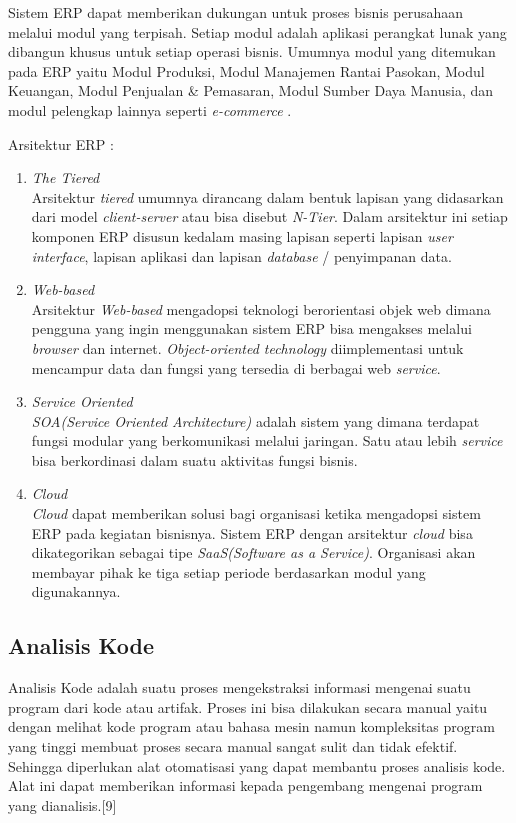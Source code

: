 Sistem ERP dapat memberikan dukungan untuk proses bisnis perusahaan melalui modul yang terpisah. Setiap modul adalah aplikasi perangkat lunak yang dibangun khusus untuk setiap operasi bisnis. Umumnya modul yang ditemukan pada ERP yaitu Modul Produksi, Modul Manajemen Rantai Pasokan, Modul Keuangan, Modul Penjualan \& Pemasaran, Modul Sumber Daya Manusia, dan modul pelengkap lainnya seperti \textit{e-commerce} \cite{1}.

Arsitektur ERP \cite{1}: 
\begin{enumerate}[leftmargin=1.3cm]
	\item \textit{The Tiered}\\
	Arsitektur \textit{tiered} umumnya dirancang dalam bentuk lapisan yang didasarkan dari model \textit{client-server} atau bisa disebut \textit{N-Tier}. Dalam arsitektur ini setiap komponen ERP disusun kedalam masing lapisan seperti lapisan \textit{user interface}, lapisan aplikasi dan lapisan \textit{database} / penyimpanan data.
	\item \textit{Web-based}\\
	Arsitektur \textit{Web-based} mengadopsi teknologi berorientasi objek web dimana pengguna yang ingin menggunakan sistem ERP bisa mengakses melalui \textit{browser} dan internet. \textit{Object-oriented technology} diimplementasi untuk mencampur data dan fungsi yang tersedia di berbagai web \textit{service}.
	\item \textit{Service Oriented}\\
	\textit{SOA(Service Oriented Architecture)} adalah sistem yang dimana terdapat fungsi  modular yang berkomunikasi melalui jaringan. Satu atau lebih \textit{service} bisa berkordinasi dalam suatu aktivitas fungsi bisnis. 
	\item \textit{Cloud}\\
	\textit{Cloud} dapat memberikan solusi bagi organisasi ketika mengadopsi sistem ERP pada kegiatan bisnisnya. Sistem ERP dengan arsitektur \textit{cloud} bisa dikategorikan sebagai tipe \textit{SaaS(Software as a Service)}. Organisasi akan membayar pihak ke tiga setiap periode berdasarkan modul yang digunakannya.\\ 
\end{enumerate}

\subsection{Analisis Kode}
Analisis Kode adalah suatu proses mengekstraksi informasi mengenai suatu program dari kode atau artifak. Proses ini bisa dilakukan secara manual yaitu dengan melihat kode program atau bahasa mesin namun kompleksitas program yang tinggi membuat proses secara manual sangat sulit dan tidak efektif. Sehingga diperlukan alat otomatisasi yang dapat membantu proses analisis kode. Alat ini dapat memberikan informasi kepada pengembang mengenai program yang dianalisis.[9] 

